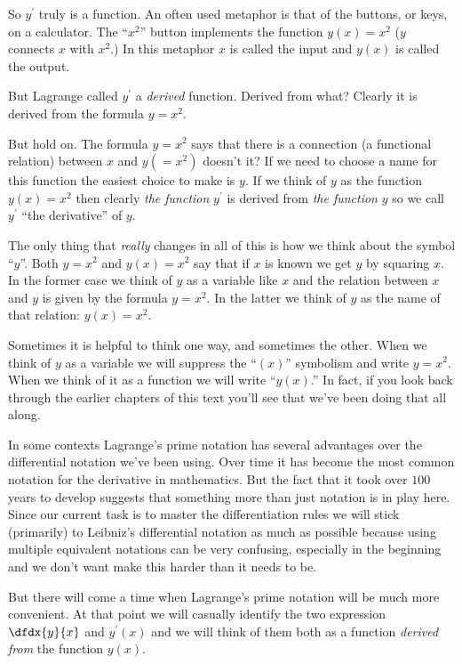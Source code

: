 \begin{Digression}
  So $y^\prime$ truly is a function. An often used metaphor is that of
  the  buttons, or keys, on a
  calculator. The ``$x^2$'' button implements the function $y(x)=x^2$
  ($y$ connects $x$ with $x^2$.) In this metaphor $x$ is called the
  input and $y(x)$ is called the output.

  But Lagrange called $y^\prime$ a \emph{derived} function. Derived from
  what? Clearly it is derived from the formula $y=x^2$.

  But hold on.  The formula $y=x^2$ says that there is a connection (a
  functional relation) between $x$ and $y(=x^2)$ doesn't it?  If we
  need to choose a name for this function the easiest choice to make
  is $y$.  If we think of $y$ as the function $y(x)=x^2$ then clearly
  \emph{the function} $y^\prime$ is derived from \emph{the function}
  $y$ so we call $y^\prime$ ``the derivative'' of $y$.

  The only thing that \emph{really} changes in all of this is how we
  think about the symbol ``$y$''. Both $y=x^2$ and $y(x)=x^2$ say that
  if $x$ is known we get $y$ by squaring $x$. In the former case
  we think of $y$ as a variable like $x$ and the relation between $x$
  and $y$ is given by the formula $y=x^2$. In the latter we think of
  $y$ as the name of that relation: $y(x)=x^2$.

  Sometimes it is helpful to think one way, and sometimes the
  other. When we  think of $y$ as a variable we will suppress
  the ``$(x)$'' symbolism and write $y=x^2$. When we think of it as a
  function we will write ``$y(x)$.'' In fact, if you look back through
  the earlier chapters of this text you'll see that we've been doing
  that all along.
\end{Digression}

In some contexts Lagrange's prime notation has several advantages over
the differential notation we've been using. Over time it has become
the most common notation for the derivative in mathematics. But the
fact that it took over $100$ years to develop suggests that something
more than just notation is in play here. Since our current task is to
master the differentiation rules we will stick (primarily) to
Leibniz's differential notation as much as possible because using
multiple equivalent notations can be very confusing, especially in the
beginning and we don't want make this harder than it needs to be.


But there will come a time when Lagrange's prime notation will be much
more convenient.  At that point we will casually identify the two
expression $\dfdx{y}{x}$ and $y^\prime(x)$ and we will think of them
both as a function \emph{derived from} the function $y(x)$.

